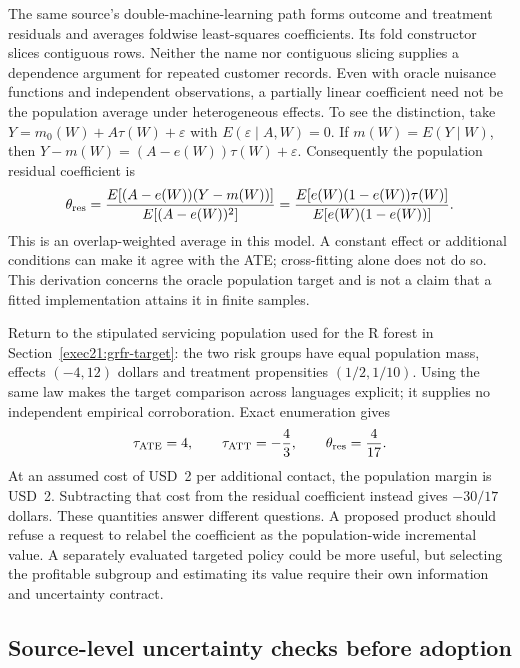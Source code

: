 The same source's double-machine-learning path forms outcome and treatment
residuals and averages foldwise least-squares coefficients. Its fold
constructor slices contiguous rows. Neither the name nor contiguous slicing
supplies a dependence argument for repeated customer records. Even with
oracle nuisance functions and independent observations, a partially linear
coefficient need not be the population average under heterogeneous effects.
To see the distinction, take
$Y=m_0(W)+A\tau(W)+\varepsilon$ with
$E(\varepsilon\mid A,W)=0$. If $m(W)=E(Y\mid W)$, then
$Y-m(W)=(A-e(W))\tau(W)+\varepsilon$. Consequently the population residual
coefficient is
\begin{equation}
\label{exec21:effects-residual}
 \theta_{\rm res}
 =\frac{E[(A-e(W))(Y-m(W))]}{E[(A-e(W))^2]}
 =\frac{E[e(W)(1-e(W))\tau(W)]}{E[e(W)(1-e(W))]}.
\end{equation}
This is an overlap-weighted average in this model. A constant effect or
additional conditions can make it agree with the ATE; cross-fitting alone
does not do so. This derivation concerns the oracle population target and is
not a claim that a fitted implementation attains it in finite samples.
\cite{exec21_effects_causalelm,exec21_effects_reference}

Return to the stipulated servicing population used for the R forest in
Section~\ref{exec21:grfr-target}: the two risk groups have equal population
mass, effects $(-4,12)$ dollars and treatment propensities $(1/2,1/10)$.
Using the same law makes the target comparison across languages explicit;
it supplies no independent empirical corroboration. Exact enumeration gives
\begin{equation}
\label{exec21:effects-targetexample}
 \tau_{\rm ATE}=4,\qquad
 \tau_{\rm ATT}=-\frac43,\qquad
 \theta_{\rm res}=\frac4{17}.
\end{equation}
At an assumed cost of USD~2 per additional contact, the population margin is
USD~2. Subtracting that cost from the residual coefficient instead gives
$-30/17$ dollars. These quantities answer different questions. A proposed
product should refuse a request to relabel the coefficient as the
population-wide incremental value. A separately evaluated targeted policy
could be more useful, but selecting the profitable subgroup and estimating
its value require their own information and uncertainty contract.
\cite{exec21_effects_reference}

\subsection{Source-level uncertainty checks before adoption}
\label{exec21:effects-uncertainty}

